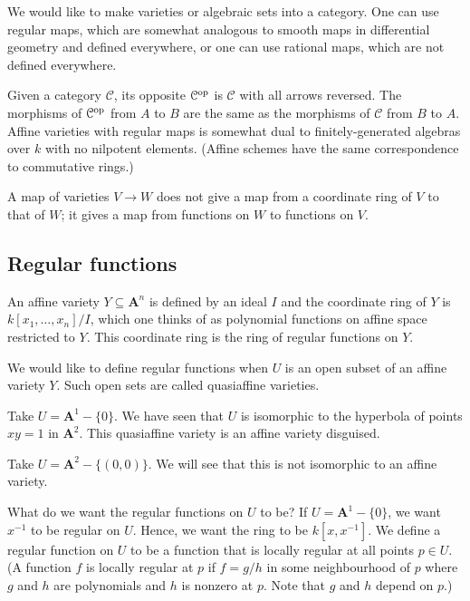 \documentclass[11pt, oneside,margin=1in]{article}
\begin{document}
We would like to make varieties or algebraic sets into a category. One can use regular maps, which are somewhat analogous to smooth maps in differential geometry and defined everywhere, or one can use rational maps, which are not defined everywhere.

Given a category $\mathcal{C} $, its opposite $\mathcal{C}\textsuperscript{op}$ is $\mathcal{C} $ with all arrows reversed. The morphisms of ${\mathcal{C}}\textsuperscript{op} $ from $A$ to $B$ are the same as the morphisms of $\mathcal{C} $ from $B$ to $A$. Affine varieties with regular maps is somewhat dual to finitely-generated algebras over $k$ with no nilpotent elements. (Affine schemes have the same correspondence to commutative rings.)

A map of varieties $V\longrightarrow W$ does not give a map from a coordinate ring of $V$ to that of $W$; it gives a map from functions on $W$ to functions on $V$.


\subsection{Regular functions}
An affine variety $Y\subseteq \mathbf{A}^n$ is defined by an ideal $I$ and the coordinate ring of $Y$ is $k[x_1,\hdots,x_n]/I$, which one thinks of as polynomial functions on affine space restricted to $Y$. This coordinate ring is the ring of regular functions on $Y$.

We would like to define regular functions when $U$ is an open subset of an affine variety $Y$. Such open sets are called quasiaffine varieties.

\begin{example}\label{}\text{}
Take $U=\mathbf{A}^1-\{0\}$. We have seen that $U$ is isomorphic to the hyperbola of points $xy=1$ in $\mathbf{A}^2$. This quasiaffine variety is an affine variety disguised.

Take $U=\mathbf{A}^2-\{(0,0)\}$. We will see that this is not isomorphic to an affine variety.
\end{example}

What do we want the regular functions on $U$ to be? If $U=\mathbf{A}^1-\{0\}$, we want $x^{-1}$ to be regular on $U$. Hence, we want the ring to be $k[x,x^{-1}]$. We define a regular function on $U$ to be a function that is locally regular at all points $p\in U$. (A function $f$ is locally regular at $p$ if $f=g/h$ in some neighbourhood of $p$ where $g$ and $h$ are polynomials and $h$ is nonzero at $p$. Note that $g$ and $h$ depend on $p$.) 
\end{document}
